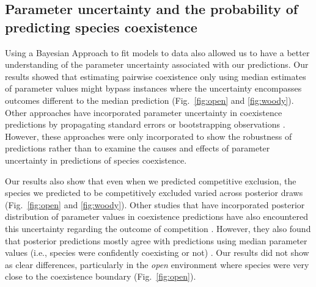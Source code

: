 \begin{refsection}
\subsection*{Parameter uncertainty and the probability of predicting species coexistence}


Using a Bayesian Approach to fit models to data also allowed us to have a better understanding of the parameter uncertainty associated with our predictions. Our results showed that estimating pairwise coexistence only using median estimates of parameter values might bypass instances where the uncertainty encompasses outcomes different to the median prediction (Fig.~\ref{fig:open} and \ref{fig:woody}). Other approaches have incorporated parameter uncertainty in coexistence predictions by propagating standard errors \citep{matias2018experimental} or bootstrapping observations \citep{garcia2020cxr}. However, these approaches were only incorporated to show the robustness of predictions rather than to examine the causes and effects of parameter uncertainty in predictions of species coexistence.

Our results also show that even when we predicted competitive exclusion, the species we predicted to be competitively excluded varied across posterior draws (Fig.~\ref{fig:open} and \ref{fig:woody}). Other studies that have incorporated posterior distribution of parameter values  in coexistence predictions have also encountered this uncertainty regarding the outcome of competition \citep{terry2021natural}. However, they also found that posterior predictions mostly agree with predictions using median parameter values (i.e., species were confidently coexisting or not) \citep{terry2021natural}. Our results did not show as clear differences, particularly in the \textit{open} environment where species were very close to the coexistence boundary (Fig.~\ref{fig:open}).




\end{refsection}
